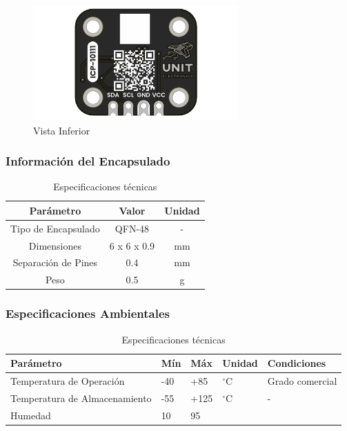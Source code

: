 \documentclass[11pt,a4paper]{article}
\begin{document}
\begin{figure}[H]
\centering
\includegraphics[width=0.7\textwidth]{es_unit_btm_v_1_0_0_icp10111_barometric_pressure_sensor.png}
\caption{Vista Inferior}
\label{fig:es-unit-btm-v-1-0-0-icp10111-barometric-pressure-sensor-png}
\end{figure}



\subsubsection{Información del Encapsulado}


\begin{table}[H]
\centering
\small
\begin{tabular}{|c|c|c|}
\hline
Parámetro & Valor & Unidad \\
\hline
Tipo de Encapsulado & QFN-48 & - \\
Dimensiones & 6 x 6 x 0.9 & mm \\
Separación de Pines & 0.4 & mm \\
Peso & 0.5 & g \\
\hline
\end{tabular}
\caption{Especificaciones técnicas}
\end{table}


\subsubsection{Especificaciones Ambientales}


\begin{table}[H]
\centering
\small
\begin{tabular}{|l|l|l|l|l|}
\hline
Parámetro & Mín & Máx & Unidad & Condiciones \\
\hline
Temperatura de Operación & -40 & +85 & $^{\circ}$C & Grado comercial \\
Temperatura de Almacenamiento & -55 & +125 & $^{\circ}$C & - \\
Humedad & 10 & 95 & %
\hline
\end{tabular}
\caption{Especificaciones técnicas}
\end{table}
\end{document}
